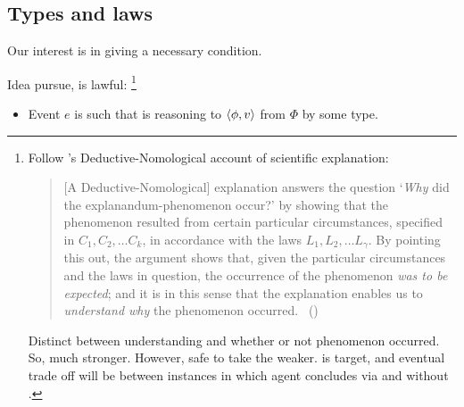 \subsection{Types and laws}

\begin{note}
  Our interest is in giving a necessary condition.

  Idea pursue, \tRN{} is lawful:%
  \footnote{
    Follow \citeauthor{Hempel:1965aa}'s Deductive-Nomological account of scientific explanation:

    \begin{quote}
      [A Deductive-Nomological] explanation answers the question
      `\emph{Why} did the explanandum-phenomenon occur?'
      by showing that the phenomenon resulted from certain particular circumstances, specified in \(C_{1}, C_{2}, \dots C_{k}\), in accordance with the laws \(L_{1}, L_{2}, \dots L_{\gamma}\).
      By pointing this out, the argument shows that, given the particular circumstances and the laws in question, the occurrence of the phenomenon \emph{was to be expected}; and it is in this sense that the explanation enables us to \emph{understand why} the phenomenon occurred.%
      \mbox{ }\hfill\mbox{(\citeyear[337]{Hempel:1965aa})}
    \end{quote}

    Distinct between understanding and whether or not phenomenon occurred.
    So, much stronger.
    However, safe to take the weaker.
    \qWhyV{} is target, and eventual trade off will be between instances in which agent concludes via \tR{} and \ros{} without \wit{}.
  }

  \begin{idea}
    \label{idea:tR-law}

    \begin{itemize}
    \item
      Event \(e\) is such that \vAgent{} is reasoning to \(\langle \phi, v \rangle\) from \(\Phi\) by some type.
    \end{itemize}


\end{idea}
\end{note}

